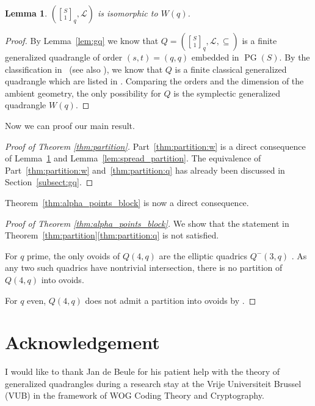 \documentclass[a4paper,abstracton,12pt]{scrartcl}
\newcommand{\qbinom}[3]{\genfrac{[}{]}{0pt}{}{#1}{#2}_{#3}}
\DeclareMathOperator{\PG}{PG}
\newtheorem{lemma}{Lemma}[section]
\theoremstyle{definition}
\theoremstyle{remark}
\begin{document}
\begin{lemma}
	\label{lem:w}
	$(\qbinom{S}{1}{q},\mathcal{L})$ is isomorphic to $W(q)$.
\end{lemma}

\begin{proof}
	By Lemma~\ref{lem:gq} we know that $Q = (\qbinom{S}{1}{q},\mathcal{L}, \subseteq)$ is a finite generalized quadrangle of order $(s,t) = (q,q)$ embedded in $\PG(S)$.
	By the classification in~\cite[Theorem~1]{Buekenhout-Lefevre-1974-ArchMath25[1]:540-552} (see also \cite[4.4.8]{Payne-Thas-2009-FiniteGeneralizedQuadrangles2nd}), we know that $Q$ is a finite classical generalized quadrangle which are listed in \cite[3.1.2]{Payne-Thas-2009-FiniteGeneralizedQuadrangles2nd}.
	Comparing the orders and the dimension of the ambient geometry, the only possibility for $Q$ is the symplectic generalized quadrangle $W(q)$.
\end{proof}

Now we can proof our main result.

\begin{proof}[{{Proof of Theorem \ref{thm:partition}}}]
	Part~\ref{thm:partition:w} is a direct consequence of Lemma~\ref{lem:w} and Lemma~\ref{lem:spread_partition}.
	The equivalence of Part~\ref{thm:partition:w} and~\ref{thm:partition:q} has already been discussed in Section~\ref{subsect:gq}.
\end{proof}

Theorem~\ref{thm:alpha_points_block} is now a direct consequence.

\begin{proof}[{{Proof of Theorem \ref{thm:alpha_points_block}}}]
	We show that the statement in Theorem~\ref{thm:partition}\ref{thm:partition:q} is not satisfied.

	For $q$ prime, the only ovoids of $Q(4,q)$ are the elliptic quadrics $Q^{-}(3,q)$ \cite[Cor.~1]{Ball-Govaerts-Storme-2006-DCC38[1]:131-145}.
	As any two such quadrics have nontrivial intersection, there is no partition of $Q(4,q)$ into ovoids.

	For $q$ even, $Q(4,q)$ does not admit a partition into ovoids by \cite[3.4.1~(i)]{Payne-Thas-2009-FiniteGeneralizedQuadrangles2nd}.
\end{proof}

\section*{Acknowledgement}
I would like to thank Jan de Beule for his patient help with the theory of generalized quadrangles during a research stay at the Vrije Universiteit Brussel (VUB) in the framework of WOG Coding Theory and Cryptography.

\printbibliography
\end{document}
